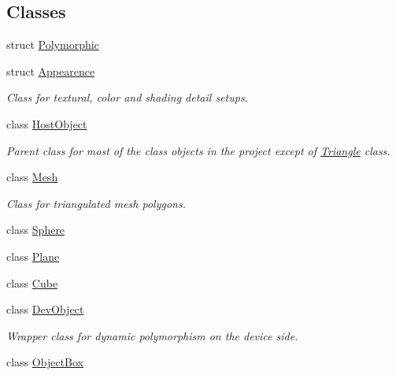 \subsection*{Classes}
\begin{DoxyCompactItemize}
\item 
struct \hyperlink{struct_polymorphic}{Polymorphic}
\item 
struct \hyperlink{struct_appearence}{Appearence}
\begin{DoxyCompactList}\small\item\em Class for textural, color and shading detail setups. \end{DoxyCompactList}\item 
class \hyperlink{class_host_object}{Host\+Object}
\begin{DoxyCompactList}\small\item\em Parent class for most of the class objects in the project except of \hyperlink{class_triangle}{Triangle} class. \end{DoxyCompactList}\item 
class \hyperlink{class_mesh}{Mesh}
\begin{DoxyCompactList}\small\item\em Class for triangulated mesh polygons. \end{DoxyCompactList}\item 
class \hyperlink{class_sphere}{Sphere}
\item 
class \hyperlink{class_plane}{Plane}
\item 
class \hyperlink{class_cube}{Cube}
\item 
class \hyperlink{class_dev_object}{Dev\+Object}
\begin{DoxyCompactList}\small\item\em Wrapper class for dynamic polymorphism on the device side. \end{DoxyCompactList}\item 
class \hyperlink{class_object_box}{Object\+Box}
\end{DoxyCompactItemize}
